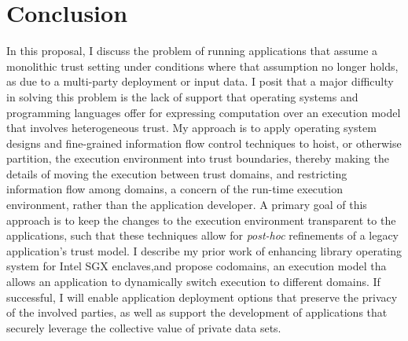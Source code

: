 \section{Conclusion}
\label{sec:conclusion}

In this proposal, I discuss the problem of running applications that
assume a monolithic trust setting under conditions where that assumption no
longer holds, as due to a multi-party deployment or input data.
%
I posit that a major difficulty in solving this problem is the lack of support
that operating systems and programming languages offer for expressing
computation over an execution model that involves heterogeneous trust.
%
My approach is to apply operating system designs and fine-grained information
flow control techniques to hoist, or otherwise partition, the execution
environment into trust boundaries, thereby making the details of moving the
execution between trust domains, and restricting information flow among domains, a
concern of the run-time execution environment, rather than the application
developer.
% 
A primary goal of this approach is to keep the changes to the execution environment
transparent to the applications, such that these techniques allow for
\emph{post-hoc} refinements of a legacy application's trust model.
% 
I describe my prior work of enhancing library operating system for Intel SGX
enclaves,and propose codomains, an execution model tha allows an application to
dynamically switch execution to different domains.
%
If successful, I will enable application deployment options that preserve
the privacy of the involved parties, as well as support the development of
applications that securely leverage the collective value of private data sets.
